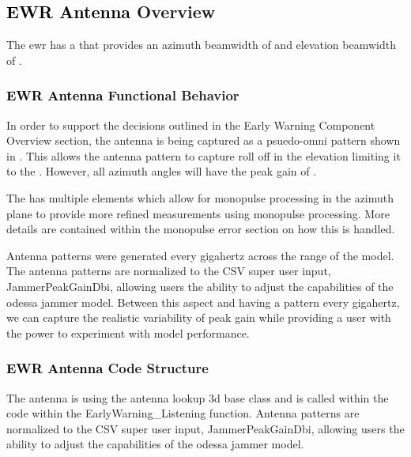 \renewcommand\componentname{\textcolor{black}{\textbf{EWR Antenna }}}

\subsection{\unclass \componentname Overview}
\classlabelshort The \modelname \gls{ewr} has a \antennaType that provides an azimuth beamwidth of \azimuthBeamwidthDeg and elevation beamwidth of \elevationBeamwidthDeg .





\subsubsection{\unclass \componentname Functional Behavior}
\classlabelshort In order to support the decisions outlined in the Early Warning Component Overview section, the antenna is being captured as a psuedo-omni pattern shown in . This allows the antenna pattern to capture roll off in the elevation limiting it to the \elevationBeamwidthDeg. However, all azimuth angles will have the peak gain of \PeakGaindBi.

\classlabelshort The \modelname has multiple elements which allow for monopulse processing in the azimuth plane to provide more refined measurements using monopulse processing. More details are contained within the monopulse error section on how this is handled.

\classlabelshort Antenna patterns were generated every gigahertz across the \frequency range of the \modelname model. The antenna patterns are normalized to the CSV super user input, JammerPeakGainDbi, allowing users the ability to adjust the capabilities of the \gls{odessa} jammer model. Between this aspect and having a pattern every gigahertz, we can capture the realistic variability of peak gain while providing a user with the power to experiment with model performance.


\subsubsection{\unclass \componentname Code Structure}
\classlabelshort The antenna is using the antenna lookup 3d base class and is called within the \modelname code within the EarlyWarning\_Listening function. Antenna patterns are normalized to the CSV super user input, JammerPeakGainDbi, allowing users the ability to adjust the capabilities of the \gls{odessa} jammer model.

